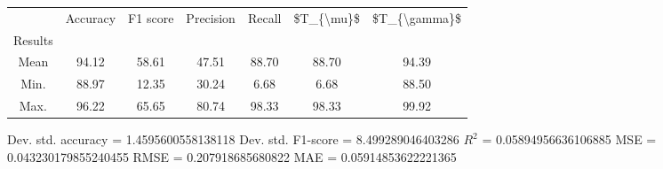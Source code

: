 \begin{tabular}{|c|c|c|c|c|c|c|}
\toprule
{} &  Accuracy &  F1 score &  Precision &  Recall &  \$T\_\{\textbackslash mu\}\$ &  \$T\_\{\textbackslash gamma\}\$ \\
Results &           &           &            &         &            &               \\
\hline
Mean    &     94.12 &     58.61 &      47.51 &   88.70 &      88.70 &         94.39 \\
Min.    &     88.97 &     12.35 &      30.24 &    6.68 &       6.68 &         88.50 \\
Max.    &     96.22 &     65.65 &      80.74 &   98.33 &      98.33 &         99.92 \\
\bottomrule
\end{tabular}

 Dev. std. accuracy = 1.4595600558138118
 Dev. std. F1-score = 8.499289046403286
 $R^2$ = 0.05894956636106885
 MSE = 0.043230179855240455
 RMSE = 0.207918685680822
 MAE = 0.05914853622221365
